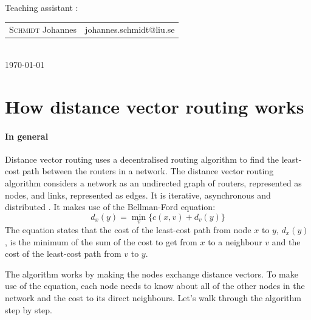 \documentclass[12pt,a4paper]{article}
\begin{document}
\begin{titlepage}
\normalsize
Teaching assistant :\\[0.2cm]
{\begin{tabular}{ll}
\textsc{Schmidt} Johannes & johannes.schmidt@liu.se \\
\end{tabular}}
\\[2cm]

\vfill
{\normalsize \today} %

\newpage

\end{titlepage}



  
\section{How distance vector routing works}
\paragraph{In general}
Distance vector routing uses a decentralised routing algorithm to find the least-cost path between the routers in a network.
The distance vector routing algorithm considers a network as an undirected graph of routers, represented as nodes, and links, represented as edges. It is iterative, asynchronous and distributed \cite[p.~371]{cn}. It makes use of the Bellman-Ford equation:
\begin{equation}
d_x(y) = \min_v\{c(x,v) + d_v(y)\}
\label{eq:bf}
\end{equation}
The equation states that the cost of the least-cost path from node $x$ to $y$, $d_x(y)$, is the minimum of the sum of the cost to get from $x$ to a neighbour $v$ and the cost of the least-cost path from $v$ to $y$.

The algorithm works by making the nodes exchange distance vectors.
To make use of the equation, each node needs to know about all of the other nodes in the network and the cost to its direct neighbours. Let's walk through the algorithm step by step.
\end{document}
